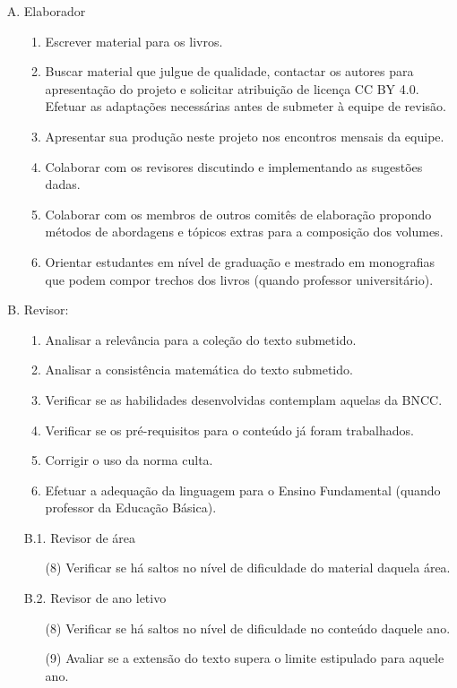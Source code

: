 \documentclass[10 pt]{article}
\begin{document}
 \begin{enumerate}[A.]
  \item Elaborador
  \begin{enumerate}[(1)]
   \item Escrever material para os livros.
   \item Buscar material que julgue de qualidade, contactar os autores para apresentação do projeto e solicitar atribuição de licença CC BY 4.0. Efetuar as adaptações necessárias antes de submeter à equipe de revisão.
   \item Apresentar sua produção neste projeto nos encontros mensais da equipe.
   \item Colaborar com os revisores discutindo e implementando as sugestões dadas.
   \item Colaborar com os membros de outros comitês de elaboração propondo métodos de abordagens e tópicos extras para a composição dos volumes.
   \item Orientar estudantes em nível de graduação e mestrado em monografias que podem compor trechos dos livros (quando professor universitário).

  \end{enumerate}

  \item Revisor:
  \begin{enumerate}[(1)]
  \item Analisar a relevância para a coleção do texto submetido.
  \item Analisar a consistência matemática do texto submetido.
  \item Verificar se as habilidades desenvolvidas contemplam aquelas da BNCC.
  \item Verificar se os pré-requisitos para o conteúdo já foram trabalhados.
  \item Corrigir o uso da norma culta.
  \item Efetuar a adequação da linguagem para o Ensino Fundamental (quando professor da Educação Básica).
  \end{enumerate}

   \item[B.1.] Revisor de área
   \begin{enumerate}
\item[(8)] Verificar se há saltos no nível de dificuldade do material daquela área.
   \end{enumerate}

  \item[B.2.] Revisor de ano letivo
  \begin{enumerate}
\item[(8)] Verificar se há saltos no nível de dificuldade no conteúdo daquele ano.
\item[(9)] Avaliar se a extensão do texto supera o limite estipulado para aquele ano.
  \end{enumerate}
  \end{enumerate}
\end{document}

